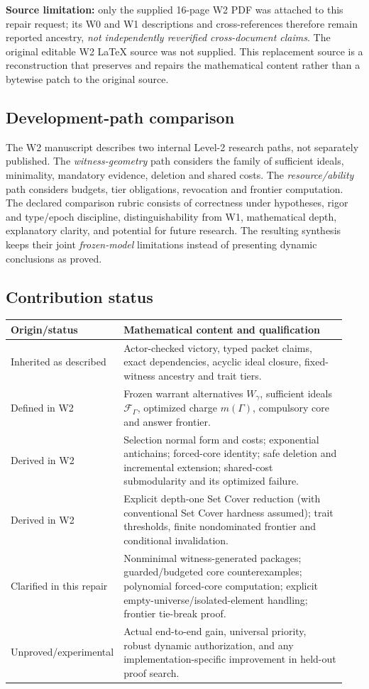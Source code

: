 \documentclass[10pt,letterpaper]{article}
\theoremstyle{definition}
\theoremstyle{remark}
\begin{document}
\textbf{Source limitation:} only the supplied 16-page W2 PDF was attached to this repair request; its W0 and W1 descriptions and cross-references therefore remain reported ancestry, \emph{not independently reverified cross-document claims}. The original editable W2 \LaTeX{} source was not supplied. This replacement source is a reconstruction that preserves and repairs the mathematical content rather than a bytewise patch to the original source.

\subsection{Development-path comparison}
The W2 manuscript describes two internal Level-2 research paths, not separately published. The \emph{witness-geometry} path considers the family of sufficient ideals, minimality, mandatory evidence, deletion and shared costs. The \emph{resource/ability} path considers budgets, tier obligations, revocation and frontier computation. The declared comparison rubric consists of correctness under hypotheses, rigor and type/epoch discipline, distinguishability from W1, mathematical depth, explanatory clarity, and potential for future research. The resulting synthesis keeps their joint \emph{frozen-model} limitations instead of presenting dynamic conclusions as proved.

\subsection{Contribution status}
\begin{longtable}{@{}p{0.22\linewidth}p{0.72\linewidth}@{}}
\toprule
Origin/status & Mathematical content and qualification\\\midrule
Inherited as described & Actor-checked victory, typed packet claims, exact dependencies, acyclic ideal closure, fixed-witness ancestry and trait tiers.\\
Defined in W2 & Frozen warrant alternatives $W_\gamma$, sufficient ideals $\mathcal F_\Gamma$, optimized charge $m(\Gamma)$, compulsory core and answer frontier.\\
Derived in W2 & Selection normal form and costs; exponential antichains; forced-core identity; safe deletion and incremental extension; shared-cost submodularity and its optimized failure.\\
Derived in W2 & Explicit depth-one Set Cover reduction (with conventional Set Cover hardness assumed); trait thresholds, finite nondominated frontier and conditional invalidation.\\
Clarified in this repair & Nonminimal witness-generated packages; guarded/budgeted core counterexamples; polynomial forced-core computation; explicit empty-universe/isolated-element handling; frontier tie-break proof.\\
Unproved/experimental & Actual end-to-end gain, universal priority, robust dynamic authorization, and any implementation-specific improvement in held-out proof search.\\\bottomrule
\end{longtable}
\end{document}
